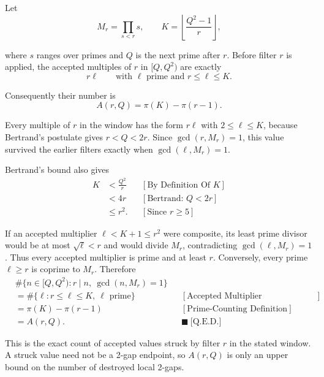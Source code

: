 Let
\begin{equation*}
M_r=\prod_{s\lt r}s,
\qquad
K=\left\lfloor\frac{Q^2-1}{r}\right\rfloor,
\end{equation*}

where $s$ ranges over primes and $Q$ is the next prime after $r$. Before
filter $r$ is applied, the accepted multiples of $r$ in $[Q,Q^2)$ are exactly
\begin{equation*}
r\ell
\qquad\text{with }\ell\text{ prime and }r\le\ell\le K.
\end{equation*}

Consequently their number is
\begin{equation*}
A(r,Q)=\pi(K)-\pi(r-1).
\end{equation*}

Every multiple of $r$ in the window has the form $r\ell$ with
$2\le\ell\le K$, because Bertrand's postulate gives $r\lt Q\lt2r$. Since
$\gcd(r,M_r)=1$, this value survived the earlier filters exactly when
$\gcd(\ell,M_r)=1$.

Bertrand's bound also gives
\begin{equation*}
\begin{aligned}
K
&\lt\frac{Q^2}{r}
&&[\text{By Definition Of }K]\\
&\lt4r
&&[\text{Bertrand: }Q\lt2r]\\
&\le r^2.
&&[\text{Since }r\ge5]
\end{aligned}
\end{equation*}

If an accepted multiplier $\ell\lt K+1\le r^2$ were composite, its least prime
divisor would be at most $\sqrt\ell\lt r$ and would divide $M_r$, contradicting
$\gcd(\ell,M_r)=1$. Thus every accepted multiplier is prime and at least $r$.
Conversely, every prime $\ell\ge r$ is coprime to $M_r$. Therefore
\begin{equation*}
\begin{aligned}
& \#\{n\in[Q,Q^2):r\mid n,\ \gcd(n,M_r)=1\}\\
&=\#\{\ell:r\le\ell\le K,\ \ell\text{ prime}\}
&&[\text{Accepted Multiplier Characterization}]\\
&=\pi(K)-\pi(r-1)
&&[\text{Prime-Counting Definition}]\\
&=A(r,Q).
&&\blacksquare\ \text{[Q.E.D.]}
\end{aligned}
\end{equation*}

This is the exact count of accepted values struck by filter $r$ in the stated
window. A struck value need not be a 2-gap endpoint, so $A(r,Q)$ is only an
upper bound on the number of destroyed local 2-gaps.

